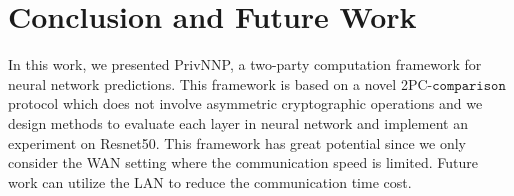 \documentclass[letterpaper]{article} %
\begin{document}
    \section{Conclusion and Future Work}
    In this work, we presented PrivNNP, a two-party computation framework for neural network predictions.
    This framework is based on a novel 2PC-$\mathtt{comparison}$ protocol which does not involve asymmetric cryptographic operations
    and we design methods to evaluate each layer in neural network and implement an experiment on Resnet50.
    This framework has great potential
    since we only consider the WAN setting where the communication speed is limited.
    Future work can utilize the LAN to reduce the communication time cost.

\end{document}
